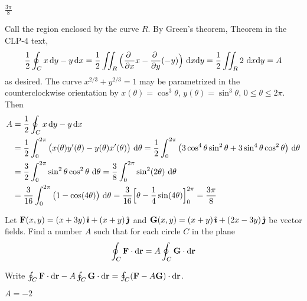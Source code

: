 
\begin{answer} 
$\frac{3\pi}{8}$
\end{answer}

\begin{solution} 
Call the region enclosed by the curve $R$. By Green's theorem,
Theorem  in the CLP-4 text,
\begin{equation*}
\frac{1}{2}\oint_C x\,\dee{y}-y\,\dee{x}
=\frac{1}{2}\dblInt_R\Big(\pdiff{}{x}x
-\pdiff{}{y}(-y)\Big)\ \dee{x}\dee{y}
=\frac{1}{2}\dblInt_R 2\ \dee{x}\dee{y}
=A
\end{equation*}
as desired. The curve $x^{2/3}+y^{2/3}=1$ may be parametrized in the 
counterclockwise orientation by $x(\theta)=\cos^3\theta$, $y(\theta)=\sin^3\theta$,
$0\le\theta\le 2\pi$. Then
\begin{align*}
A&=\frac{1}{2}\oint_C x\,\mathrm{d}y-y\,\mathrm{d}x \\
&=\frac{1}{2}\int_0^{2\pi}\big( x(\theta)y'(\theta)-y(\theta)x'(\theta)\big)\ \mathrm{d}\theta
=\frac{1}{2}\int_0^{2\pi}\big( 3\cos^4\theta\sin^2\theta+3\sin^4\theta\cos^2\theta\big)\ \mathrm{d}\theta\\
&=\frac{3}{2}\int_0^{2\pi}\sin^2\theta\cos^2\theta\ \mathrm{d}\theta
=\frac{3}{8}\int_0^{2\pi}\sin^2(2\theta)\ \mathrm{d}\theta \\
&=\frac{3}{16}\int_0^{2\pi}\big(1-\cos(4\theta)\big)\ \mathrm{d}\theta
=\frac{3}{16}\Big[\theta-\frac{1}{4}\sin(4\theta)\Big]_0^{2\pi}
=\frac{3\pi}{8}
\end{align*}
\end{solution}

\begin{question}[M317 2001D] %
Let $\mathbf{F}(x,y)=(x+3y)\,\hat{\pmb{\imath}}+(x+y)\,\hat{\pmb{\jmath}}$ and 
$\mathbf{G}(x,y)=(x+y)\,\hat{\pmb{\imath}}+(2x-3y)\,\hat{\pmb{\jmath}}$ be vector fields. Find a number $A$ such
that for each circle $C$ in the plane
$$
\oint_C\mathbf{F}\cdot \mathrm{d}\mathbf{r}=A\oint_C\mathbf{G}\cdot \mathrm{d}\mathbf{r}
$$
\end{question}

\begin{hint} 
Write $\oint_C\mathbf{F}\cdot \mathrm{d}\mathbf{r}-A\oint_C\mathbf{G}\cdot \mathrm{d}\mathbf{r}
=\oint_C(\mathbf{F}-A\mathbf{G})\cdot \mathrm{d}\mathbf{r}$.
\end{hint}

\begin{answer} 
$A=-2$
\end{answer}

